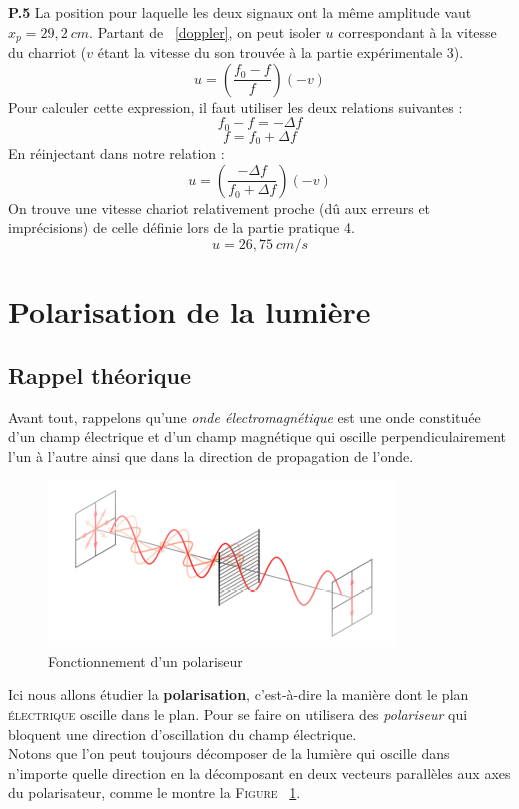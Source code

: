 \documentclass	[11pt, a4paper, openany]{book}
\begin{document}
		\textbf{P.5}
		La position pour laquelle les deux signaux ont la même amplitude vaut $x_p = 29,2\ cm$. Partant de ~\eqref{doppler}, on peut isoler $u$ correspondant à la vitesse du charriot ($v$ étant la vitesse du son trouvée à la partie expérimentale 3).
		\begin{equation}
			u = \left(\frac{f_0 - f}{f}\right)\left(-v\right)
		\end{equation}
		Pour calculer cette expression, il faut utiliser les deux relations suivantes :
		\begin{equation}
			f_0 - f = -\Delta f
		\end{equation}
		\begin{equation}
			f = f_0 + \Delta f
		\end{equation}
		En réinjectant dans notre relation : 
		\begin{equation}
			u = \left(\frac{-\Delta f}{f_0 + \Delta f}\right)\left(-v\right)
		\end{equation}
		On trouve une vitesse chariot relativement proche (dû aux erreurs et imprécisions) de celle définie lors de la partie pratique 4.
		\begin{equation}
			u = 26,75\ cm/s
		\end{equation}
		
		
		\newpage
		\section{Polarisation de la lumière}
		\subsection{Rappel théorique}
		Avant tout, rappelons qu'une \textit{onde électromagnétique} est une onde constituée d'un champ électrique et d'un champ magnétique qui oscille perpendiculairement l'un à l'autre ainsi que dans la direction de propagation de l'onde.\\
		\begin{figure}[h]
			\begin{center}
				\includegraphics[scale=0.5]{labo/image3.png}
			\end{center}
			\caption{Fonctionnement d'un polariseur}
			\label{image1}
		\end{figure}
		Ici nous allons étudier la \textbf{polarisation}, c'est-à-dire la manière dont le plan \textsc{électrique} oscille dans le plan. Pour se faire on utilisera des \textit{polariseur} qui bloquent une direction d'oscillation du champ électrique.\\
		Notons que l'on peut toujours décomposer de la lumière qui oscille dans n'importe quelle direction en la décomposant en deux vecteurs parallèles aux axes du polarisateur, comme le montre la \textsc{Figure} ~\ref{image1}.\\
		
\end{document}
